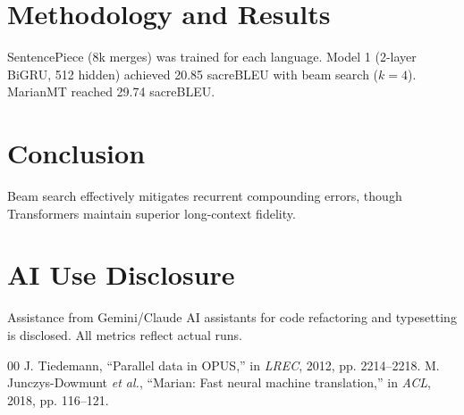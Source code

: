 \documentclass[conference]{IEEEtran}
\begin{document}
\section{Methodology and Results}
SentencePiece (8k merges) was trained for each language. Model 1 (2-layer BiGRU, 512 hidden) achieved 20.85 sacreBLEU with beam search ($k=4$). MarianMT reached 29.74 sacreBLEU.

\section{Conclusion}
Beam search effectively mitigates recurrent compounding errors, though Transformers maintain superior long-context fidelity.

\section*{AI Use Disclosure}
Assistance from Gemini/Claude AI assistants for code refactoring and typesetting is disclosed. All metrics reflect actual runs.

\begin{thebibliography}{00}
 J. Tiedemann, ``Parallel data in OPUS,'' in \textit{LREC}, 2012, pp. 2214--2218.
 M. Junczys-Dowmunt \textit{et al.}, ``Marian: Fast neural machine translation,'' in \textit{ACL}, 2018, pp. 116--121.
\end{thebibliography}
\end{document}
